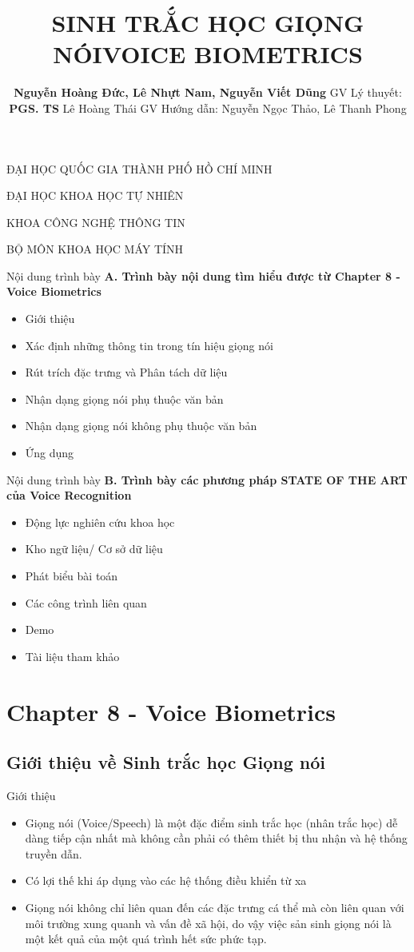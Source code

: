 \documentclass[notheorems, aspectratio=54]{beamer}
\author{\textbf{Nguyễn Hoàng Đức, Lê Nhựt Nam, Nguyễn Viết Dũng}\newline\newline
	GV Lý thuyết: \textbf{PGS. TS} Lê Hoàng Thái\newline
	GV Hướng dẫn: Nguyễn Ngọc Thảo, Lê Thanh Phong}
\title{SINH TRẮC HỌC GIỌNG NÓI\newline VOICE BIOMETRICS}
\begin{document}
\begin{frame}
	\centering
	ĐẠI HỌC QUỐC GIA THÀNH PHỐ HỒ CHÍ MINH
	
	ĐẠI HỌC KHOA HỌC TỰ NHIÊN
	
	KHOA CÔNG NGHỆ THÔNG TIN
	
	BỘ MÔN KHOA HỌC MÁY TÍNH
	\titlepage
\end{frame}
\begin{frame}{Nội dung trình bày}
	\textbf{A. Trình bày nội dung tìm hiểu được từ Chapter 8 - Voice Biometrics}
	\begin{itemize}
		\item Giới thiệu
		\item Xác định những thông tin trong tín hiệu giọng nói
		\item Rút trích đặc trưng và Phân tách dữ liệu
		\item Nhận dạng giọng nói phụ thuộc văn bản
		\item Nhận dạng giọng nói không phụ thuộc văn bản
		\item Ứng dụng
	\end{itemize}
\end{frame}
\begin{frame}{Nội dung trình bày}
	\textbf{B. Trình bày các phương pháp STATE OF THE ART của Voice Recognition}
	\begin{itemize}
		\item Động lực nghiên cứu khoa học
		\item Kho ngữ liệu/ Cơ sở dữ liệu 
		\item Phát biểu bài toán
		\item Các công trình liên quan
		\item Demo
		\item Tài liệu tham khảo
	\end{itemize}
\end{frame}

\section{Chapter 8 - Voice Biometrics}
\subsection{Giới thiệu về Sinh trắc học Giọng nói}
\begin{frame}{Giới thiệu}
	\begin{itemize}
		\item Giọng nói (Voice/Speech) là một đặc điểm sinh trắc học (nhân trắc học) dễ dàng tiếp cận nhất mà không cần phải có thêm thiết bị thu nhận và hệ thống truyền dẫn.
		\item Có lợi thế khi áp dụng vào các hệ thống điều khiển từ xa
		\item Giọng nói không chỉ liên quan đến các đặc trưng cá thể mà còn liên quan với môi trường xung quanh và vấn đề xã hội, do vậy việc sản sinh giọng nói là một kết quả của một quá trình hết sức phức tạp.
	\end{itemize}
\end{frame}
\end{document}
